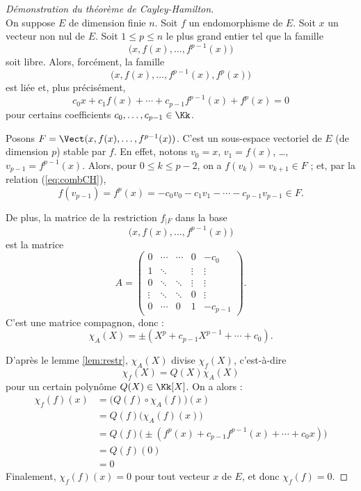 \documentclass[12pt, class=report,crop=false]{standalone}
\begin{document}
\begin{proof}[Démonstration du théorème de Cayley-Hamilton]~\\
On suppose $E$ de dimension finie $n$.
Soit $f$ un endomorphisme de $E$. Soit $x$ un vecteur non nul de $E$. 
Soit $1 \le p \le n$ le plus grand entier tel que la famille
\[\big( x, f(x),\ldots,f^{p-1}(x) \big)\]
soit libre. Alors, forcément, la famille 
\[\big( x, f(x),\ldots,f^{p-1}(x),f^{p}(x) \big)\]
est liée et, plus précisément,  
\begin{equation}
\label{eq:combCH}
c_0x + c_1 f(x) + \cdots +c_{p-1}f^{p-1}(x) + f^p(x) =0
\end{equation}
pour certains coefficients $c_0,\ldots, c_{p-1}\in \Kk$.

Posons $F  = \Vect( x, f(x),\ldots,f^{p-1}(x) )$. 
C'est un sous-espace vectoriel de $E$ (de dimension $p$) stable par $f$. 
En effet, notons $v_0 = x$, $v_1 = f(x)$, \ldots, $v_{p-1} = f^{p-1}(x)$.
Alors, pour $0 \le k \le p-2$, on a $f(v_k) = v_{k+1} \in F$ ;
et, par la relation (\ref{eq:combCH}), 
$$f(v_{p-1}) = f^p(x) = -c_0 v_0 - c_1v_1 - \cdots - c_{p-1}v_{p-1} \in F.$$

De plus, la matrice de la restriction $f_{|F}$ dans la base 
\[\big(x, f(x),\ldots,f^{p-1}(x)\big)\]
est la matrice
\[A = 
\begin{pmatrix}
0&\cdots&\cdots&0&-c_{0}\\
1&\ddots&&\vdots&\vdots\\
0&\ddots&\ddots&\vdots&\vdots\\
\vdots&\ddots&\ddots&0&\vdots\\
0&\cdots&0&1&-c_{p-1}
\end{pmatrix}.\]
C'est une matrice compagnon, donc :
\[\chi_A(X)= \pm(X^p + c_{p-1}X^{p-1}+\cdots+c_0) .\]


D'après le lemme \ref{lem:restr}, $\chi_A(X)$ divise $\chi_f(X)$, c'est-à-dire
\[\chi_f(X)= Q(X)\chi_A(X)\]
pour un certain polynôme $Q(X) \in \Kk[X]$. On a alors :
\begin{align*}
\chi_f(f)(x)
  &= \big(Q(f) \circ \chi_A(f)\big) (x) \\
  &= Q(f) \big( \chi_A(f) (x) \big) \\
  &= Q(f) \big( \pm(f^p(x)+c_{p-1}f^{p-1}(x)+\cdots+c_0x)\big) \\
  &= Q(f)(0) \\
  &= 0
\end{align*}
Finalement, $\chi_f(f)(x)=0$ pour tout vecteur $x$ de $E$, et donc $\chi_f(f)=0$.
\end{proof}
\end{document}
